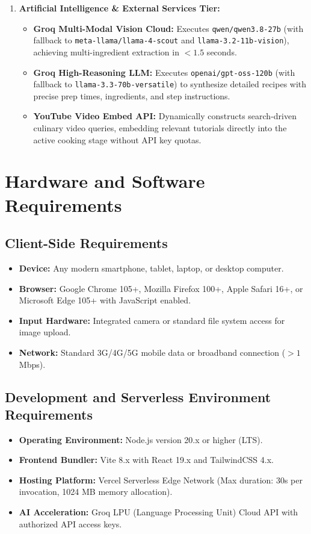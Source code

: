 \begin{enumerate}
    \item \textbf{Artificial Intelligence \& External Services Tier:}
    \begin{itemize}
        \item \textbf{Groq Multi-Modal Vision Cloud:} Executes \texttt{qwen/qwen3.8-27b} (with fallback to \texttt{meta-llama/llama-4-scout} and \texttt{llama-3.2-11b-vision}), achieving multi-ingredient extraction in $< 1.5$ seconds.
        \item \textbf{Groq High-Reasoning LLM:} Executes \texttt{openai/gpt-oss-120b} (with fallback to \texttt{llama-3.3-70b-versatile}) to synthesize detailed recipes with precise prep times, ingredients, and step instructions.
        \item \textbf{YouTube Video Embed API:} Dynamically constructs search-driven culinary video queries, embedding relevant tutorials directly into the active cooking stage without API key quotas.
    \end{itemize}
\end{enumerate}

\section{Hardware and Software Requirements}

\subsection*{Client-Side Requirements}
\begin{itemize}
    \item \textbf{Device:} Any modern smartphone, tablet, laptop, or desktop computer.
    \item \textbf{Browser:} Google Chrome 105+, Mozilla Firefox 100+, Apple Safari 16+, or Microsoft Edge 105+ with JavaScript enabled.
    \item \textbf{Input Hardware:} Integrated camera or standard file system access for image upload.
    \item \textbf{Network:} Standard 3G/4G/5G mobile data or broadband connection ($> 1$ Mbps).
\end{itemize}

\subsection*{Development and Serverless Environment Requirements}
\begin{itemize}
    \item \textbf{Operating Environment:} Node.js version 20.x or higher (LTS).
    \item \textbf{Frontend Bundler:} Vite 8.x with React 19.x and TailwindCSS 4.x.
    \item \textbf{Hosting Platform:} Vercel Serverless Edge Network (Max duration: 30s per invocation, 1024 MB memory allocation).
    \item \textbf{AI Acceleration:} Groq LPU (Language Processing Unit) Cloud API with authorized API access keys.
\end{itemize}

